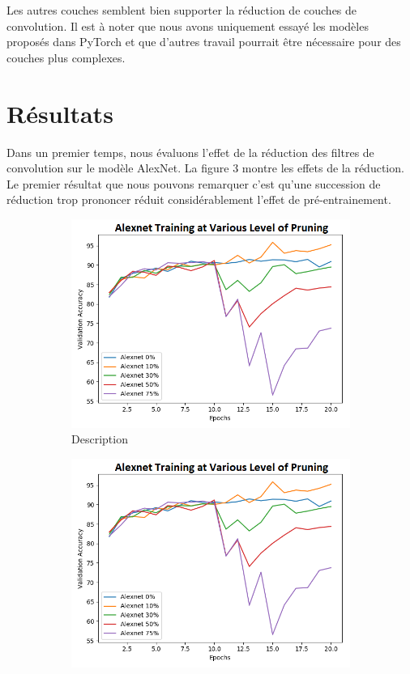 \documentclass[12pt]{article}
\begin{document}
Les autres couches semblent bien supporter la réduction de couches de convolution. Il est à noter que nous avons uniquement essayé les modèles proposés dans PyTorch et que d'autres travail pourrait être nécessaire pour des couches plus complexes. 

\section*{Résultats}
Dans un premier temps, nous évaluons l’effet de la réduction des filtres de convolution sur le modèle AlexNet. La figure 3 montre les effets de la réduction. Le premier résultat que nous pouvons remarquer c’est qu’une succession de réduction trop prononcer réduit considérablement l’effet de pré-entrainement. 
\begin{figure}[H]
	\centering
	\begin{subfigure}[b]{0.5\textwidth}            
		\includegraphics[width=\textwidth]{prune_ratio_rough}
		\caption{Description}
		\label{fig:pruneratiorough}
	\end{subfigure}%
	\begin{subfigure}[b]{0.5\textwidth}
		\centering
		\includegraphics[width=\textwidth]{prune_ratio_slow}

\end{subfigure}
\end{figure}
\end{document}
